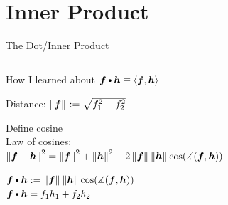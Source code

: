 \documentclass[10pt,compress,xcolor={usenames,dvipsnames},aspectratio=169]{beamer}
\begin{document}
\section{Inner Product}
\begin{frame}[label = dotproduct]{The Dot/Inner Product}
\begin{columns}
\begin{column}{0.5\textwidth}
How I learned about $\vf \bigcdot \vh \equiv \ip{\vf}{\vh}$
	
\begin{description}
\setlength{\itemsep}{3ex}
\item[Geometry] Distance: $\left \lVert \boldsymbol{f} \right \rVert_{{}} := \sqrt{f_1^2 + f_2^2}$

\item[Trigonometry] Define cosine \\
Law of cosines: \\
\hspace{-10ex}$\left \lVert \boldsymbol{f}-\boldsymbol{h} \right \rVert_{{}}^2 = \left \lVert \boldsymbol{f} \right \rVert_{{}}^2 + \left \lVert \boldsymbol{h} \right \rVert_{{}}^2 - 2 \left \lVert \boldsymbol{f} \right \rVert_{{}}\left \lVert \boldsymbol{h} \right \rVert_{{}}\cos(\measuredangle(\boldsymbol{f},\boldsymbol{h}))$

\item[Physics] $\vf \bigcdot \vh := \norm{\vf}\norm{\vh}\cos(\measuredangle(\vf,\vh))$ \\
$\vf \bigcdot \vh = f_1h_1 + f_2 h_2$
\end{description}
\end{column}
\begin{column}{0.5\textwidth}
\end{column}
\end{columns}
\end{frame}
\end{document}
